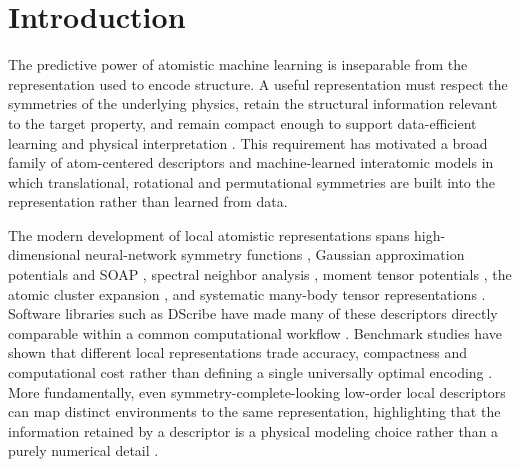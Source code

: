 \documentclass[twoside,twocolumn,9pt]{article}
\begin{document}
\renewcommand*\rmdefault{bch}\normalfont\upshape
\rmfamily

\section*{Introduction}

The predictive power of atomistic machine learning is inseparable from the representation used to encode structure. A useful representation must respect the symmetries of the underlying physics, retain the structural information relevant to the target property, and remain compact enough to support data-efficient learning and physical interpretation \cite{Butler2018,Ramprasad2017,Ward2016,Musil2021}. This requirement has motivated a broad family of atom-centered descriptors and machine-learned interatomic models in which translational, rotational and permutational symmetries are built into the representation rather than learned from data.

The modern development of local atomistic representations spans high-dimensional neural-network symmetry functions \cite{Behler2007,Behler2011}, Gaussian approximation potentials and SOAP \cite{Bartok2010,Bartok2013}, spectral neighbor analysis \cite{Thompson2015}, moment tensor potentials \cite{Shapeev2016}, the atomic cluster expansion \cite{Drautz2019}, and systematic many-body tensor representations \cite{Huo2022}. Software libraries such as DScribe have made many of these descriptors directly comparable within a common computational workflow \cite{Himanen2020}. Benchmark studies have shown that different local representations trade accuracy, compactness and computational cost rather than defining a single universally optimal encoding \cite{Zuo2020}. More fundamentally, even symmetry-complete-looking low-order local descriptors can map distinct environments to the same representation, highlighting that the information retained by a descriptor is a physical modeling choice rather than a purely numerical detail \cite{Pozdnyakov2020}.
\end{document}
